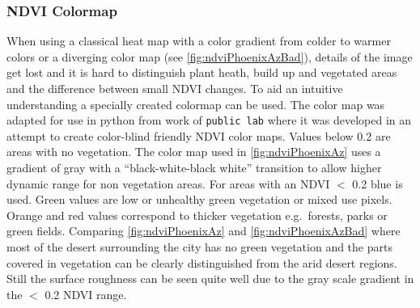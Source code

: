 \subsubsection{NDVI Colormap}\label{sec:colormap}
When using a classical heat map with a color gradient from colder to warmer colors or a diverging color map (see \cref{fig:ndviPhoenixAzBad}), details of the image get lost and it is hard to distinguish plant heath, build up and vegetated areas and the difference between small \gls{NDVI} changes.
To aid an intuitive understanding a specially created colormap can be used. 
The color map was adapted for use in python from work of \texttt{public lab}\cite{ndviCmap} where it was developed in an attempt to create color-blind friendly \gls{NDVI} color maps.
Values below 0.2 are areas with no vegetation.
The color map used in \cref{fig:ndviPhoenixAz} uses a gradient of gray with a ``black-white-black
white'' transition to allow higher dynamic range for non vegetation areas.
For areas with an \gls{NDVI} $<$ 0.2 blue is used. Green values are low or unhealthy green vegetation or mixed use pixels. 
Orange and red values correspond to thicker vegetation e.g.~forests, parks or green fields. 
%
Comparing \cref{fig:ndviPhoenixAz}  and \cref{fig:ndviPhoenixAzBad} where most of the desert surrounding the city has no green vegetation and the parts covered in vegetation can be clearly distinguished from the arid desert regions.
Still the surface roughness can be seen quite well due to the gray scale gradient in the $<$ 0.2 \gls{NDVI} range.  
%
